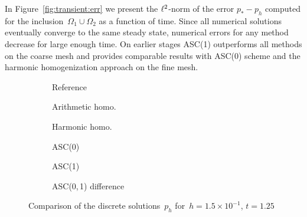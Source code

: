 In Figure~\ref{fig:transient:err} we present the ${\ell^2}$-norm of the error $p_* - p_h$ computed for the inclusion~$\Omega_1 \cup \Omega_2$ as a function of time. Since all numerical solutions eventually converge to the same steady state, numerical errors for any method decrease for large enough time. On earlier stages ASC(1) outperforms all methods on the coarse mesh and provides comparable results with ASC(0) scheme and the harmonic homogenization approach on the fine mesh.

\clearpage

\begin{figure}
	\centering
	\begin{subfigure}{.3\linewidth}
		\centering
		\caption{Reference}
	\end{subfigure}%
	\hfill
	\begin{subfigure}{.3\linewidth}
		\centering
		\caption{Arithmetic homo.}	
	\end{subfigure}%
	\hfill
	\begin{subfigure}{.3\linewidth}
		\centering
		\caption{Harmonic homo.}	
	\end{subfigure}%
	\par
	\begin{subfigure}{.3\linewidth}
		\centering
		\caption{ASC(0)}
	\end{subfigure}%
	\hfill
	\begin{subfigure}{.3\linewidth}
		\centering
		\caption{ASC(1)}	
	\end{subfigure}%
	\hfill
	\begin{subfigure}{.3\linewidth}
		\centering
		\caption{ASC(0,\,1) difference}	
	\end{subfigure}%
	\caption{Comparison of the discrete solutions~$p_h$ for~$h = 1.5 \times 10^{-1}$, $t = 1.25$ \label{fig:transient:comp}}
\end{figure}
